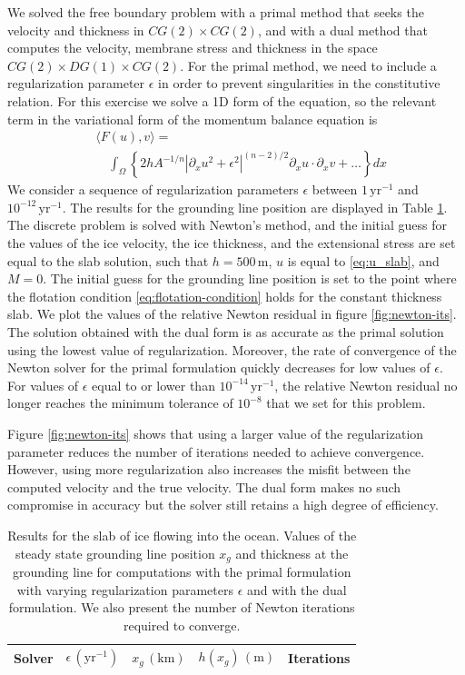 \documentclass[review,oneside]{igs}
\begin{document}
We solved the free boundary problem with a primal method that seeks the velocity and thickness in $CG(2)\times CG(2)$, and with a dual method that computes the velocity, membrane stress and thickness in the space $CG(2)\times DG(1)\times CG(2)$.
For the primal method, we need to include a regularization parameter $\epsilon$ in order to prevent singularities in the constitutive relation.
For this exercise we solve a 1D form of the equation, so the relevant term in the variational form of the momentum balance equation is
\begin{align}
    & \langle F(u), v\rangle = \nonumber\\
    & \quad \int_\Omega \left\{2hA^{-1/n}|\partial_xu^2 + \epsilon^2|^{(n - 2)/2}\partial_xu\cdot\partial_xv + \ldots\right\}dx
\end{align}
We consider a sequence of regularization parameters $\epsilon$ between $1\, \mathrm{yr}^{-1}$ and $10^{-12}\,\mathrm{yr}^{-1}$.
The results for the grounding line position are displayed in Table \ref{tab:slab}.
The discrete problem is solved with Newton's method, and the initial guess for the values of the ice velocity, the ice thickness, and the extensional stress are set equal to the slab solution, such that $h = 500\,\mathrm{m}$, $u$ is equal to \eqref{eq:u_slab}, and $M = 0$.
The initial guess for the grounding line position is set to the point where the flotation condition \eqref{eq:flotation-condition} holds for the constant thickness slab.
We plot the values of the relative Newton residual in figure \ref{fig:newton-its}.
The solution obtained with the dual form is as accurate as the primal solution using the lowest value of regularization.
Moreover, the rate of convergence of the Newton solver for the primal formulation quickly decreases for low values of $\epsilon$.
For values of $\epsilon$ equal to or lower than $10^{-14}\,\mathrm{yr}^{-1}$, the relative Newton residual no longer reaches the minimum tolerance of $10^{-8}$ that we set for this problem.

Figure \ref{fig:newton-its} shows that using a larger value of the regularization parameter reduces the number of iterations needed to achieve convergence.
However, using more regularization also increases the misfit between the computed velocity and the true velocity.
The dual form makes no such compromise in accuracy but the solver still retains a high degree of efficiency.

\begin{table}[h]
\centering
\caption{Results for the slab of ice flowing into the ocean. Values of the steady state grounding line position $x_g$ and thickness at the grounding line for computations with the primal formulation with varying regularization parameters $\epsilon$ and with the dual formulation. We also present the number of Newton iterations required to converge.}
\label{tab:slab}
\begin{tabular}{ccccc}
\toprule
    Solver & $\epsilon\,(\mathrm{yr}^{-1})$ & $x_g\,(\mathrm{km})$ & $h(x_g)\,(\mathrm{m})$ & Iterations \\
\midrule

\end{tabular}
\end{table}
\end{document}
